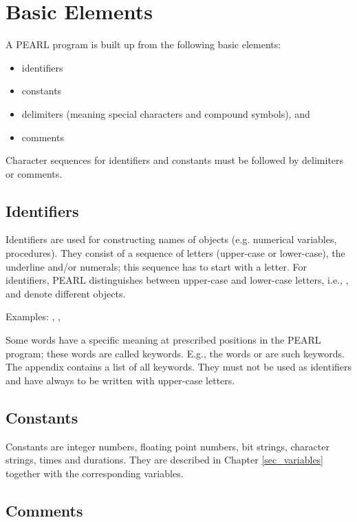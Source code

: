 \section{Basic Elements}    %

A PEARL program is built up from the following basic elements:

\begin{itemize}
\item identifiers
\item constants
\item delimiters (meaning special characters and compound symbols), and
\item comments
\end{itemize}

Character sequences for identifiers and constants must be followed by
delimiters or comments.

\subsection{Identifiers}   %

Identifiers are used for constructing names of objects (e.g. numerical
variables, procedures). They consist of a sequence of letters
(upper-case or lower-case), the underline and/or numerals; this sequence
has to start with a letter. For identifiers, PEARL distinguishes between
upper-case and lower-case letters, i.e., ,  and 
 denote different objects.

Examples: , , 

Some words have a specific meaning at prescribed positions in the PEARL
program; these words are called keywords. E.g., the words  or 
are such keywords. The appendix contains a list of all keywords. They
must not be used as identifiers and have always to be written with
upper-case letters.

\subsection{Constants}   %

Constants are integer numbers, floating point numbers, bit strings,
character strings, times and durations. They are described in Chapter 
\ref{sec_variables}
together with the corresponding variables.

\subsection{Comments}    %

